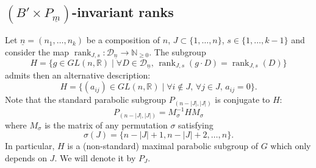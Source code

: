 \documentclass[pdftex]{sigma}
\numberwithin{equation}{section}
\theoremstyle{definition}
\newcommand{\rank}{\operatorname{rank}}
\newcommand{\R}{\mathbb{R}}
\newcommand{\N}{\mathbb{N}}
\newcommand{\D}{\mathcal{D}}
\theoremstyle{plain}
\theoremstyle{plain}
\theoremstyle{plain}
\theoremstyle{plain}
\begin{document}
\subsection[Invariant ranks]{$(B' \times P_{\underline m})$-invariant ranks}{\label{subsection invariant}}

Let $\underline n = (n_1,\dots,n_k)$ be a composition of $n$, $J \subset \{1,\dots,n\}$, $s \in \{1,\dots,k-1\}$ and consider the map $\rank_{J,s} : \D_{\underline n} \to \N_{\geqslant 0}$. The subgroup
\begin{equation*}
	H = \{g \in GL(n,\R) \mid \forall D \in \D_{\underline n}, \, \rank_{J,s}(g \cdot D) = \rank_{J,s}(D)\}
\end{equation*}
admits then an alternative description:
\begin{equation*}
	H = \{(a_{ij}) \in GL(n,\R) \mid \forall i \notin J, \, \forall j \in J, \, a_{ij} = 0\}.
\end{equation*}
Note that the standard parabolic subgroup $P_{(n-|J|,|J|)}$ is conjugate to $H$: 
\begin{equation*}
	P_{(n-|J|,|J|)} = M_{\sigma}^{-1}HM_\sigma
\end{equation*}
where $M_\sigma$ is the matrix of any permutation $\sigma$ satisfying
\begin{equation*}
	\sigma(J) = \{n-|J|+1,n-|J|+2,\dots,n\}.
\end{equation*}
In particular, $H$ is a (non-standard) maximal parabolic subgroup of $G$ which only depends on $J$. We will denote it by $P_J$.
\end{document}
